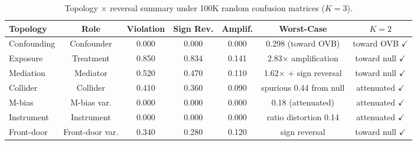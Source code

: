 \documentclass[11pt]{article}
\begin{document}
\begin{table}[t]
\centering
\caption{Topology $\times$ reversal summary under 100K random confusion matrices ($K\!=\!3$).}
\label{tab:topology-reversal}
\small
\begin{adjustbox}{max width=\textwidth}
\begin{tabular}{lcccccc}
\toprule
Topology & Role & Violation & Sign Rev. & Amplif. & Worst-Case & $K\!=\!2$ \\
\midrule
Confounding & Confounder & 0.000 & 0.000 & 0.000 & 0.298 (toward OVB) & toward OVB $\checkmark$ \\
Exposure & Treatment & 0.850 & 0.834 & 0.141 & 2.83$\times$ amplification & toward null $\checkmark$ \\
Mediation & Mediator & 0.520 & 0.470 & 0.110 & 1.62$\times$ + sign reversal & toward null $\checkmark$ \\
Collider & Collider & 0.410 & 0.360 & 0.090 & spurious 0.44 from null & attenuated $\checkmark$ \\
M-bias & M-bias var. & 0.000 & 0.000 & 0.000 & 0.18 (attenuated) & attenuated $\checkmark$ \\
Instrument & Instrument & 0.000 & 0.000 & 0.000 & ratio distortion 0.14 & attenuated $\checkmark$ \\
Front-door & Front-door var. & 0.340 & 0.280 & 0.120 & sign reversal & toward null $\checkmark$ \\
\bottomrule
\end{tabular}
\end{adjustbox}
\end{table}
\end{document}
